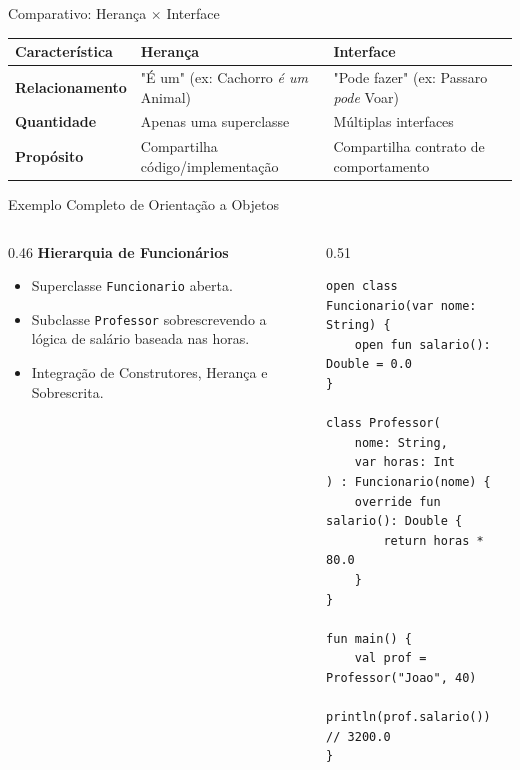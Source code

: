 \documentclass[aspectratio=169]{beamer}
\begin{document}
\begin{frame}{Comparativo: Herança $\times$ Interface}
  \vspace{0.5em}
  \centering
  \begin{table}
    \scriptsize
    \begin{tabular}{l l l}
      \toprule
      \textbf{Característica} & \textbf{Herança} & \textbf{Interface} \\
      \midrule
      \textbf{Relacionamento} & "É um" (ex: Cachorro \textit{é um} Animal) & "Pode fazer" (ex: Passaro \textit{pode} Voar) \\[4pt]
      \textbf{Quantidade} & Apenas uma superclasse & Múltiplas interfaces \\[4pt]
      \textbf{Propósito} & Compartilha código/implementação & Compartilha contrato de comportamento \\
      \bottomrule
    \end{tabular}
  \end{table}
\end{frame}

\begin{frame}[fragile]{Exemplo Completo de Orientação a Objetos}
  \begin{columns}[T]
    \begin{column}{0.46\textwidth}
      \textbf{Hierarquia de Funcionários}
      \vspace{0.3em}
      \begin{itemize}\small
        \item Superclasse \texttt{Funcionario} aberta.
        \item Subclasse \texttt{Professor} sobrescrevendo a lógica de salário baseada nas horas.
        \item Integração de Construtores, Herança e Sobrescrita.
      \end{itemize}
    \end{column}
    \begin{column}{0.51\textwidth}
\begin{lstlisting}[style=KotlinStyle]
open class Funcionario(var nome: String) {
    open fun salario(): Double = 0.0
}

class Professor(
    nome: String,
    var horas: Int
) : Funcionario(nome) {
    override fun salario(): Double {
        return horas * 80.0
    }
}

fun main() {
    val prof = Professor("Joao", 40)
    println(prof.salario()) // 3200.0
}
\end{lstlisting}
    \end{column}
  \end{columns}
\end{frame}
\end{document}
